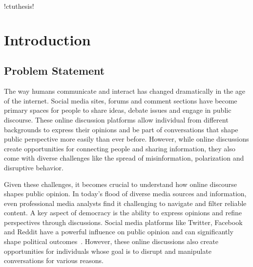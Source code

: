 \documentclass[twoside]{ctuthesis}
\theoremstyle{plain}
\theoremstyle{definition}
\theoremstyle{note}
\begin{document}
\renewcommand \ctulstsep{0pt}

\newcommand\ctuclsname{\leavevmode\unhcopy\ctuclsnamebox}
\newsavebox\ctuclsnamebox
\begin{lrbox}{\ctuclsnamebox}
\ctulst!ctuthesis!
\end{lrbox}

\maketitle

\chapter{Introduction}

\section{Problem Statement}
\par
The way humans communicate and interact has changed dramatically in the age of the internet. Social media sites, forums and comment sections have become primary spaces for people to share ideas, debate issues and engage in public discourse. These online discussion platforms allow individual from different backgrounds to express their opinions and be part of conversations that shape public perspective more easily than ever before. However, while online discussions create opportunities for connecting people and sharing information, they also come with diverse challenges like the spread of misinformation, polarization and disruptive behavior.\par

Given these challenges, it becomes crucial to understand how online discourse shapes public opinion. In today’s flood of diverse media sources and information, even professional media analysts find it challenging to navigate and filter reliable content. A key aspect of democracy is the ability to express opinions and refine perspectives through discussions. Social media platforms like Twitter, Facebook and Reddit have a powerful influence on public opinion and can significantly shape political outcomes~\cite{Bennett2012DigitalMedia}. However, these online discussions also create opportunities for individuals whose goal is to disrupt and manipulate conversations for various reasons.\par
\end{document}
